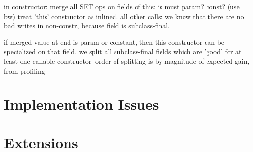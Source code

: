 \documentclass[preprint]{acmconf}
\begin{document}
in constructor:
  merge all SET ops on fields of this: is must param?  const? (use bw)
  treat 'this' constructor as inlined.
  all other calls: we know that there are no bad writes in non-constr,
   because field is subclass-final.

if merged value at end is param or constant, then this constructor
can be specialized on that field.  we split all subclass-final fields
which are 'good' for at least one callable constructor.  order of
splitting is by magnitude of expected gain, from profiling.

\section{Implementation Issues}


\section{Extensions} %
\end{document}
